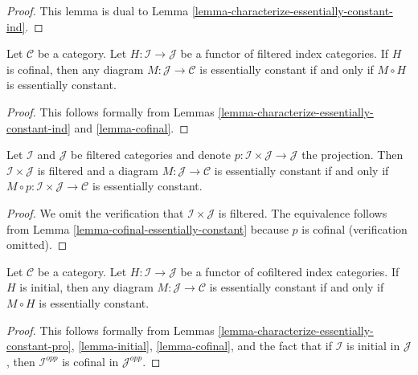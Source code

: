 \begin{proof}
This lemma is dual to Lemma \ref{lemma-characterize-essentially-constant-ind}.
\end{proof}

\begin{lemma}
\label{lemma-cofinal-essentially-constant}
Let $\mathcal{C}$ be a category. Let $H : \mathcal{I} \to \mathcal{J}$
be a functor of filtered index categories. If $H$ is cofinal, then
any diagram $M : \mathcal{J} \to \mathcal{C}$ is essentially constant
if and only if $M \circ H$ is essentially constant.
\end{lemma}

\begin{proof}
This follows formally from
Lemmas \ref{lemma-characterize-essentially-constant-ind} and
\ref{lemma-cofinal}.
\end{proof}

\begin{lemma}
\label{lemma-essentially-constant-over-product}
Let $\mathcal{I}$ and $\mathcal{J}$ be filtered categories and denote
$p : \mathcal{I} \times \mathcal{J} \to \mathcal{J}$ the projection.
Then $\mathcal{I} \times \mathcal{J}$ is filtered and a diagram
$M : \mathcal{J} \to \mathcal{C}$ is essentially constant if and only
if $M \circ p : \mathcal{I} \times \mathcal{J} \to \mathcal{C}$
is essentially constant.
\end{lemma}

\begin{proof}
We omit the verification that $\mathcal{I} \times \mathcal{J}$ is
filtered. The equivalence follows from
Lemma \ref{lemma-cofinal-essentially-constant}
because $p$ is cofinal (verification omitted).
\end{proof}

\begin{lemma}
\label{lemma-initial-essentially-constant}
Let $\mathcal{C}$ be a category. Let $H : \mathcal{I} \to \mathcal{J}$
be a functor of cofiltered index categories. If $H$ is initial, then
any diagram $M : \mathcal{J} \to \mathcal{C}$ is essentially constant
if and only if $M \circ H$ is essentially constant.
\end{lemma}

\begin{proof}
This follows formally from
Lemmas \ref{lemma-characterize-essentially-constant-pro},
\ref{lemma-initial}, \ref{lemma-cofinal}, and
the fact that if $\mathcal{I}$ is initial in $\mathcal{J}$,
then $\mathcal{I}^{opp}$ is cofinal in $\mathcal{J}^{opp}$.
\end{proof}





